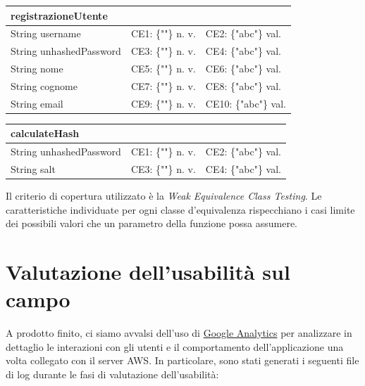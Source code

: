 \begin{table}[H]
\begin{tabular}{|l|l|l|}
\hline
\textbf{registrazioneUtente}     &                           &                         \\ \hline
String username         & CE1: \{""\} n. v.       & CE2: \{"abc"\} val.     \\ \hline
String unhashedPassword & CE3: \{""\} n. v. & CE4: \{"abc"\} val. \\ \hline
String nome             & CE5: \{""\} n. v.         & CE6: \{"abc"\} val.     \\ \hline
String cognome          & CE7: \{""\} n. v.         & CE8: \{"abc"\} val.     \\ \hline
String email            & CE9: \{""\} n. v.         & CE10: \{"abc"\} val.    \\ \hline
\end{tabular}
\end{table}
\begin{table}[H]
\begin{tabular}{|l|l|l|}
\hline
\textbf{calculateHash}  &                           &                         \\ \hline
String unhashedPassword & CE1: \{""\} n. v.       &  CE2: \{"abc"\} val.                       \\ \hline
String salt    & CE3: \{""\} n. v. & CE4: \{"abc"\} val. \\ \hline
\end{tabular}
\end{table}
Il criterio di copertura utilizzato è la \textit{\gls{Weak Equivalence Class Testing}}.
Le caratteristiche individuate per ogni classe d'equivalenza rispecchiano i casi limite dei possibili valori che un parametro della funzione possa assumere. 
\newpage
\raggedright{\section{Valutazione dell'usabilità sul campo}}
A prodotto finito, ci siamo avvalsi dell'uso di \href{https://analytics.google.com/analytics/web/}{Google Analytics} per analizzare in dettaglio le interazioni con gli utenti e il comportamento dell'applicazione una volta collegato con il server \gls{AWS}. In particolare, sono stati generati i seguenti file di log durante le fasi di valutazione dell'usabilità:

